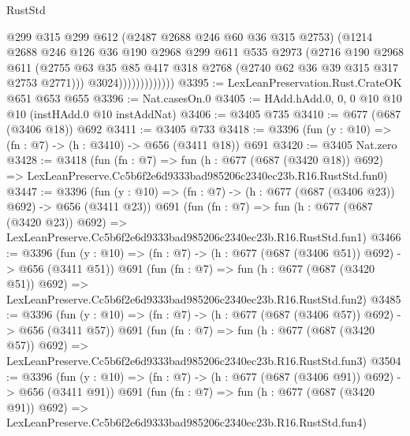 \begin{lexlean}{RustStd}
\begin{coremodule}
                            @299
                            @315
                            @299
                            @612
                            (@2487 @2688 @246 @60 @36 @315 @2753)
                            (@1214
                              @2688
                              @246
                              @126
                              @36
                              @190
                              @2968
                              @299
                              @611
                              @535
                              @2973
                              (@2716
                                @190
                                @2968
                                @611
                                (@2755
                                  @63
                                  @35
                                  @85
                                  @417
                                  @318
                                  @2768
                                  (@2740 @62 @36 @39 @315 @317 @2753 @2771)))
                              @3024)))))))))))))
@3395 := LexLeanPreservation.Rust.CrateOK @651 @653 @655
@3396 := Nat.casesOn.{0}
@3405 := HAdd.hAdd.{0, 0, 0} @10 @10 @10 (instHAdd.{0} @10 instAddNat)
@3406 := @3405 @735
@3410 := @677 (@687 (@3406 @18)) @692
@3411 := @3405 @733
@3418 := @3396 (fun (y : @10) => (fn : @7) -> (h : @3410) -> @656 (@3411 @18)) @691
@3420 := @3405 Nat.zero
@3428 := @3418
    (fun (fn : @7) =>
    fun (h : @677 (@687 (@3420 @18)) @692) =>
    LexLeanPreserve.Cc5b6f2e6d9333bad985206c2340ec23b.R16.RustStd.fun0)
@3447 := @3396
    (fun (y : @10) => (fn : @7) -> (h : @677 (@687 (@3406 @23)) @692) -> @656 (@3411 @23))
    @691
    (fun (fn : @7) =>
    fun (h : @677 (@687 (@3420 @23)) @692) =>
    LexLeanPreserve.Cc5b6f2e6d9333bad985206c2340ec23b.R16.RustStd.fun1)
@3466 := @3396
    (fun (y : @10) => (fn : @7) -> (h : @677 (@687 (@3406 @51)) @692) -> @656 (@3411 @51))
    @691
    (fun (fn : @7) =>
    fun (h : @677 (@687 (@3420 @51)) @692) =>
    LexLeanPreserve.Cc5b6f2e6d9333bad985206c2340ec23b.R16.RustStd.fun2)
@3485 := @3396
    (fun (y : @10) => (fn : @7) -> (h : @677 (@687 (@3406 @57)) @692) -> @656 (@3411 @57))
    @691
    (fun (fn : @7) =>
    fun (h : @677 (@687 (@3420 @57)) @692) =>
    LexLeanPreserve.Cc5b6f2e6d9333bad985206c2340ec23b.R16.RustStd.fun3)
@3504 := @3396
    (fun (y : @10) => (fn : @7) -> (h : @677 (@687 (@3406 @91)) @692) -> @656 (@3411 @91))
    @691
    (fun (fn : @7) =>
    fun (h : @677 (@687 (@3420 @91)) @692) =>
    LexLeanPreserve.Cc5b6f2e6d9333bad985206c2340ec23b.R16.RustStd.fun4)

\end{coremodule}
\end{lexlean}
